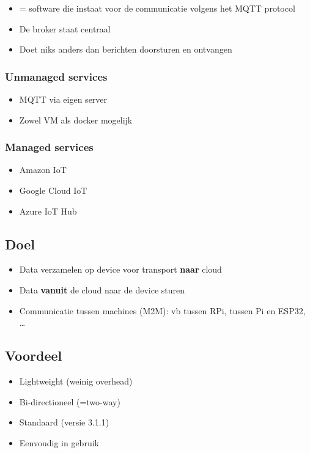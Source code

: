 \documentclass{article}
\newcommand{\bold}[1]{\textbf{#1}}
\begin{document}
\begin{itemize}
    \item = software die instaat voor de communicatie volgens het MQTT protocol
    \item De broker staat centraal
    \item Doet niks anders dan berichten doorsturen en ontvangen
\end{itemize}

\subsubsection{Unmanaged services}

\begin{itemize}
    \item MQTT via eigen server
    \item Zowel VM als docker mogelijk
\end{itemize}

\subsubsection{Managed services}
\begin{itemize}
    \item Amazon IoT
    \item Google Cloud IoT
    \item Azure IoT Hub
\end{itemize}

\subsection{Doel}
\begin{itemize}
    \item Data verzamelen op device voor transport \bold{naar} cloud
    \item Data \bold{vanuit} de cloud naar de device sturen
    \item Communicatie tussen machines (M2M): vb tussen RPi, tussen Pi en ESP32, \dots
\end{itemize}

\subsection{Voordeel}
\begin{itemize}
    \item Lightweight (weinig overhead)
    \item Bi-directioneel (=two-way)
    \item Standaard (versie 3.1.1)
    \item Eenvoudig in gebruik
\end{itemize}
\end{document}
